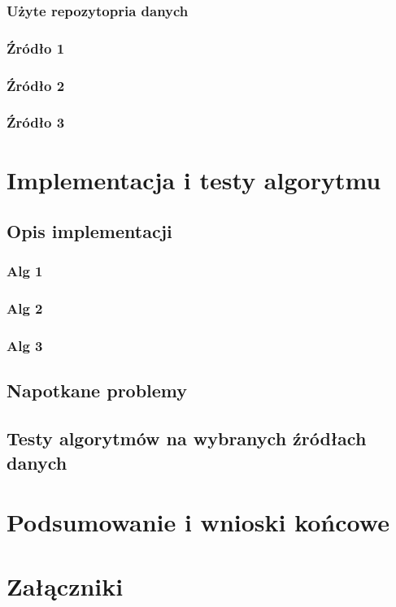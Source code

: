 \documentclass[12pt,twoside]{article}
\begin{document}
\subsubsection{Użyte repozytopria danych}
\subsubsection{Źródło 1}
\subsubsection{Źródło 2}
\subsubsection{Źródło 3}
\clearpage
\section{Implementacja i testy algorytmu}
\subsection{Opis implementacji}
\subsubsection{Alg 1}
\subsubsection{Alg 2}
\subsubsection{Alg 3}
\subsection{Napotkane problemy}
\subsection{Testy algorytmów na wybranych źródłach danych}
\clearpage

\section{Podsumowanie i wnioski końcowe}
\clearpage

\section*{Załączniki}

\clearpage


\begin{thebibliography}{4}
\end{thebibliography}

\clearpage

\makesummary
\end{document}
